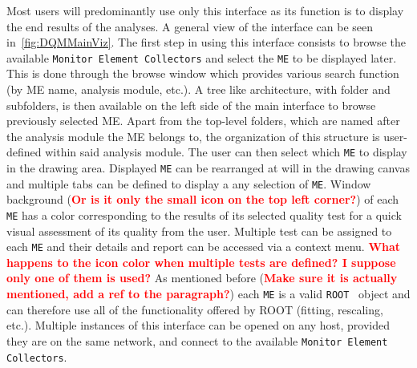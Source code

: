 \documentclass{webofc}
\begin{document}
Most users will predominantly use only this interface as its function is to display the end results of the analyses. A general view of the interface can be seen in~\autoref{fig:DQMMainViz}.
The first step in using this interface consists to browse the available \texttt{Monitor Element Collectors} and select the \texttt{ME} to be displayed later.
This is done through the browse window which provides various search function (by ME name, analysis module, etc.).
A tree like architecture, with folder and subfolders, is then available on the left side of the main interface to browse previously selected ME.
Apart from the top-level folders, which are named after the analysis module the ME belongs to, the organization of this structure is user-defined within said analysis module. 
The user can then select which \texttt{ME} to display in the drawing area.
Displayed \texttt{ME} can be rearranged at will in the drawing canvas and multiple tabs can be defined to display a any selection of \texttt{ME}. 
Window background (\textcolor{red}{\textbf{Or is it only the small icon on the top left corner?}}) of each \texttt{ME} has a color corresponding to the results of its selected quality test for a quick visual assessment of its quality from the user.
Multiple test can be assigned to each \texttt{ME} and their details and report can be accessed via a context menu. \textcolor{red}{\textbf{What happens to the icon color when multiple tests are defined? I suppose only one of them is used?}}
As mentioned before (\textcolor{red}{\textbf{Make sure it is actually mentioned, add a ref to the paragraph?}}) each \texttt{ME} is a valid \texttt{ROOT}~\cite{ROOT} object and can therefore use all of the functionality offered by ROOT (fitting, rescaling, etc.).
Multiple instances of this interface can be opened on any host, provided they are on the same network, and connect to the available \texttt{Monitor Element Collectors}. 
\end{document}
